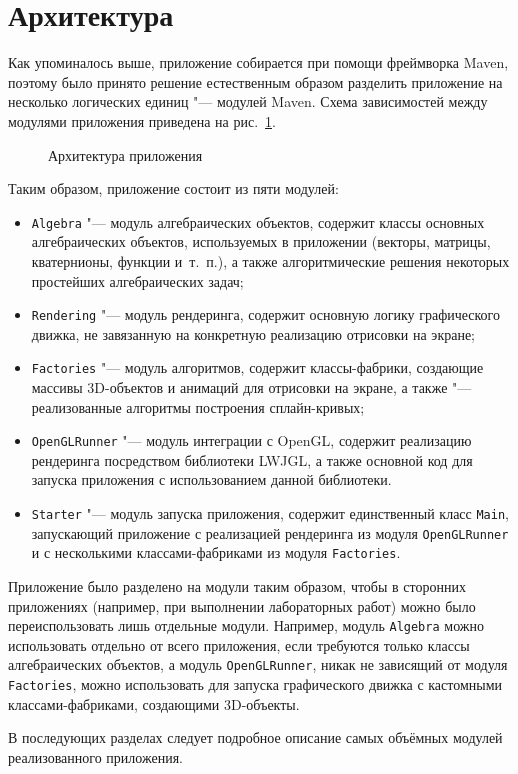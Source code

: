 \section{Архитектура}

Как упоминалось выше, приложение собирается при помощи фреймворка Maven, поэтому было принято решение естественным
образом разделить приложение на несколько логических единиц "--- модулей Maven. Схема зависимостей между модулями
приложения приведена на рис.~\ref{architecture}.

\begin{figure}[h]
\caption{Архитектура приложения}
\label{architecture}
\end{figure}

Таким образом, приложение состоит из пяти модулей:

\begin{itemize}

\item \texttt{Algebra} "--- модуль алгебраических объектов, содержит классы основных алгебраических объектов,
используемых в приложении (векторы, матрицы, кватернионы, функции и~т.~п.), а также алгоритмические решения некоторых
простейших алгебраических задач;
\item \texttt{Rendering} "--- модуль рендеринга, содержит основную логику графического движка, не завязанную
на конкретную реализацию отрисовки на экране;
\item \texttt{Factories} "--- модуль алгоритмов, содержит классы-фабрики, создающие массивы 3D-объектов и анимаций для
отрисовки на экране, а также "--- реализованные алгоритмы построения сплайн-кривых;
\item \texttt{OpenGLRunner} "--- модуль интеграции с OpenGL, содержит реализацию рендеринга посредством библиотеки
LWJGL, а также основной код для запуска приложения с использованием данной библиотеки.
\item \texttt{Starter} "--- модуль запуска приложения, содержит единственный класс \texttt{Main}, запускающий
приложение с реализацией рендеринга из модуля \texttt{OpenGLRunner} и с несколькими классами-фабриками из модуля
\texttt{Factories}.
\end{itemize}

Приложение было разделено на модули таким образом, чтобы в сторонних приложениях (например, при выполнении
лабораторных работ) можно было переиспользовать лишь отдельные модули. Например, модуль \texttt{Algebra} можно
использовать отдельно от всего приложения, если требуются только классы алгебраических объектов, а модуль
\texttt{OpenGLRunner}, никак не зависящий от модуля \texttt{Factories}, можно использовать для запуска графического
движка с кастомными классами-фабриками, создающими 3D-объекты.

В последующих разделах следует подробное описание самых объёмных модулей реализованного приложения.
